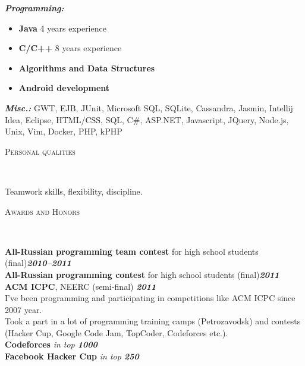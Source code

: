 \documentclass[12pt]{article}
\newenvironment{changemargin}[2]{%
  \begin{list}{}{%
    \setlength{\topsep}{0pt}%
    \setlength{\leftmargin}{#1}%
    \setlength{\rightmargin}{#2}%
    \setlength{\listparindent}{\parindent}%
    \setlength{\itemindent}{\parindent}%
    \setlength{\parsep}{\parskip}%
  }%
  \item[]}{\end{list}
}
\newcommand{\lineover}{
	\begin{changemargin}{-0.05in}{-0.05in}
		\vspace*{-8pt}
		\hrulefill \\
		\vspace*{-2pt}
	\end{changemargin}
}
\newcommand{\header}[1]{
	\begin{changemargin}{-0.5in}{-0.5in}
		\scshape{#1}\\
  	\lineover
	\end{changemargin}
}
\newenvironment{body} {
	\vspace*{-16pt}
	\begin{changemargin}{-0.25in}{-0.5in}
  }	
	{\end{changemargin}
}
\begin{document}
\begin{body}
	\vspace{14pt}
	\emph{\textbf{Programming:}}{}
	\begin{itemize}
		\item \textbf{Java} 4 years experience
		\item \textbf{C/C++} 8 years experience
		\item \textbf{Algorithms and Data Structures}
		\item \textbf{Android development} 
	\end{itemize}
	\emph{\textbf{Misc.:}}{} GWT, EJB, JUnit, Microsoft SQL, SQLite, Cassandra,
	Jasmin, Intellij Idea, Eclipse, HTML/CSS, SQL, C\#, ASP.NET, Javascript,
	JQuery, Node.js, Unix, Vim, Docker, PHP, kPHP
\end{body}

\vspace{14pt}
\smallskip
\newpage
\header{Personal qualities}

\begin{body}
	\vspace{14pt}
	Teamwork skills, flexibility, discipline.
\end{body}

\smallskip

\header{Awards and Honors}

\begin{body}
	\vspace{14pt}
	\textbf{All-Russian programming team contest} for high school students (final)\hfill \emph{\textbf{2010--2011}}\\
	\smallskip
	\textbf{All-Russian programming contest} for high school students (final)\hfill \emph{\textbf{2011}}\\
	\smallskip
	\textbf{ACM ICPC}, NEERC (semi-final) \hfill{} \emph{\textbf{2011}}\\
	\smallskip
	\vspace{14pt}
	I've been programming and participating in competitions like ACM ICPC since 2007 year. \\
	Took a part in a lot of programming training camps (Petrozavodsk) and contests (Hacker Cup, Google Code Jam, TopCoder, Codeforces etc.).\\
	\smallskip
	\textbf{Codeforces} \hfill{} \emph{in top \textbf{1000}}\\
	\smallskip
	\textbf{Facebook Hacker Cup} \hfill{} \emph{in top \textbf{250}}\\
	\smallskip
\end{body}
\end{document}
